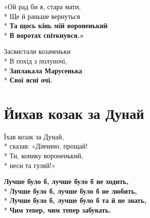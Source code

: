 \begin{minipage}{\linewidth}
«Ой рад би я, стара мати,\\*
Ще й раньше вернуться\\*
\textbf{Та щось кінь мій вороненький}\\*
\textbf{В воротах спіткнувся.»}\\
\end{minipage}\par\medskip\nobreak

\medskip

\begin{minipage}{\linewidth}
Засвистали козаченьки\\*
В похід з полуночі,\\*
\textbf{Заплакала Марусенька}\\*
\textbf{Свої ясні очі.}\\
\end{minipage}

\vspace{\fill}\newpage

\section{Йихав козак за Дунай}
\label{song:Йихав_козак_за_Дунай}

\medskip

\begin{minipage}{\linewidth}
Їхав козак за Дунай,\\*
сказав: «Дівчино, прощай!\\*
Ти, конику вороненький,\\*
неси та гуляй!»\\
\end{minipage}\par\medskip\nobreak

\medskip

\begin{minipage}{\linewidth}
\hspace*{1.5em}\textbf{Лучше було б, лучше було б не ходить,}\\*
\hspace*{1.5em}\textbf{Лучше було б, лучше було б не любить,}\\*
\hspace*{1.5em}\textbf{Лучше було б, лучше було б та й не знать,}\\*
\hspace*{1.5em}\textbf{Чим тепер, чим тепер забувать.}\\
\end{minipage}\par\medskip\nobreak

